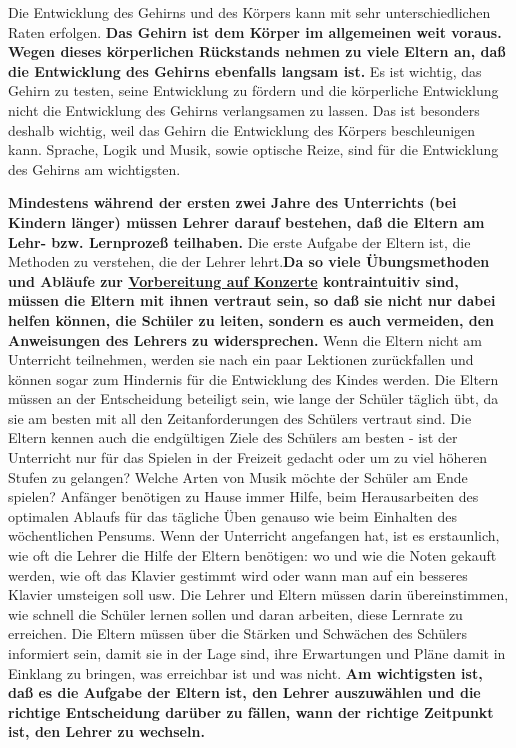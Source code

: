 Die Entwicklung des Gehirns und des Körpers kann mit sehr unterschiedlichen Raten erfolgen.
\textbf{Das Gehirn ist dem Körper im allgemeinen weit voraus.
Wegen dieses körperlichen Rückstands nehmen zu viele Eltern an, daß die Entwicklung des Gehirns ebenfalls langsam ist.}
Es ist wichtig, das Gehirn zu testen, seine Entwicklung zu fördern und die körperliche Entwicklung nicht die Entwicklung des Gehirns verlangsamen zu lassen.
Das ist besonders deshalb wichtig, weil das Gehirn die Entwicklung des Körpers beschleunigen kann.
Sprache, Logik und Musik, sowie optische Reize, sind für die Entwicklung des Gehirns am wichtigsten.

\textbf{Mindestens während der ersten zwei Jahre des Unterrichts (bei Kindern länger) müssen Lehrer darauf bestehen, daß die Eltern am Lehr- bzw. Lernprozeß teilhaben.}
Die erste Aufgabe der Eltern ist, die Methoden zu verstehen, die der Lehrer lehrt.\textbf{Da so viele Übungsmethoden und Abläufe zur \hyperref[c1iii14]{Vorbereitung auf Konzerte} kontraintuitiv sind, müssen die Eltern mit ihnen vertraut sein, so daß sie nicht nur dabei helfen können, die Schüler zu leiten, sondern es auch vermeiden, den Anweisungen des Lehrers zu widersprechen.}
Wenn die Eltern nicht am Unterricht teilnehmen, werden sie nach ein paar Lektionen zurückfallen und können sogar zum Hindernis für die Entwicklung des Kindes werden.
Die Eltern müssen an der Entscheidung beteiligt sein, wie lange der Schüler täglich übt, da sie am besten mit all den Zeitanforderungen des Schülers vertraut sind.
Die Eltern kennen auch die endgültigen Ziele des Schülers am besten - ist der Unterricht nur für das Spielen in der Freizeit gedacht oder um zu viel höheren Stufen zu gelangen?
Welche Arten von Musik möchte der Schüler am Ende spielen?
Anfänger benötigen zu Hause immer Hilfe, beim Herausarbeiten des optimalen Ablaufs für das tägliche Üben genauso wie beim Einhalten des wöchentlichen Pensums.
Wenn der Unterricht angefangen hat, ist es erstaunlich, wie oft die Lehrer die Hilfe der Eltern benötigen: wo und wie die Noten gekauft werden, wie oft das Klavier gestimmt wird oder wann man auf ein besseres Klavier umsteigen soll usw.
Die Lehrer und Eltern müssen darin übereinstimmen, wie schnell die Schüler lernen sollen und daran arbeiten, diese Lernrate zu erreichen.
Die Eltern müssen über die Stärken und Schwächen des Schülers informiert sein, damit sie in der Lage sind, ihre Erwartungen und Pläne damit in Einklang zu bringen, was erreichbar ist und was nicht.
\textbf{Am wichtigsten ist, daß es die Aufgabe der Eltern ist, den Lehrer auszuwählen und die richtige Entscheidung darüber zu fällen, wann der richtige Zeitpunkt ist, den Lehrer zu wechseln.}

